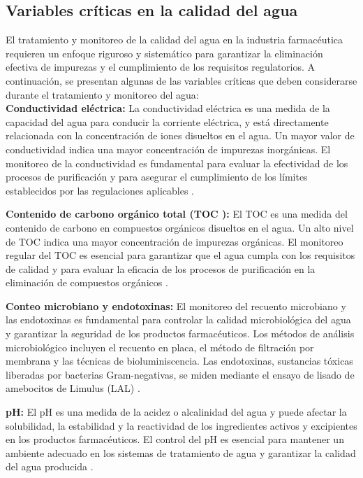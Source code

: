\subsection{Variables críticas en la calidad del agua}

El tratamiento y monitoreo de la calidad del agua en la industria farmacéutica requieren un enfoque riguroso y sistemático para garantizar la eliminación efectiva de impurezas y el cumplimiento de los requisitos regulatorios. A continuación, se presentan algunas de las variables críticas que deben considerarse durante el tratamiento y monitoreo del agua:\\

\textbf{Conductividad eléctrica:} La conductividad eléctrica es una medida de la capacidad del agua para conducir la corriente eléctrica, y 
está directamente relacionada con la concentración de iones disueltos en el agua. Un mayor valor de conductividad indica una mayor 
concentración de impurezas inorgánicas. El monitoreo de la conductividad es fundamental para evaluar la efectividad de los procesos 
de purificación y para asegurar el cumplimiento de los límites establecidos por las regulaciones aplicables \cite{oceanebidaultQueFactoresDeterminan}.

\textbf{Contenido de carbono orgánico total (TOC ):} El TOC es una medida del contenido de carbono en compuestos
orgánicos disueltos en el agua. Un alto nivel de TOC indica una mayor concentración de impurezas orgánicas.
El monitoreo regular del TOC es esencial para garantizar que el agua cumpla con los requisitos de calidad y para evaluar la eficacia 
de los procesos de purificación en la eliminación de compuestos orgánicos \cite{oceanebidaultQueFactoresDeterminan}.

\textbf{Conteo microbiano y endotoxinas:} El monitoreo del recuento microbiano y las endotoxinas es fundamental
para controlar la calidad microbiológica del agua y garantizar la seguridad de los productos farmacéuticos.
Los métodos de análisis microbiológico incluyen el recuento en placa, el método de filtración por membrana
y las técnicas de bioluminiscencia. Las endotoxinas, sustancias tóxicas liberadas por bacterias Gram-negativas,
se miden mediante el ensayo de lisado de amebocitos de Limulus (LAL) \cite{oceanebidaultQueFactoresDeterminan}.

\textbf{pH:} El pH es una medida de la acidez o alcalinidad del agua y puede afectar la solubilidad,
la estabilidad y la reactividad de los ingredientes activos y excipientes en los productos farmacéuticos.
El control del pH es esencial para mantener un ambiente adecuado en los sistemas de tratamiento de agua y
garantizar la calidad del agua producida \cite{oceanebidaultQueFactoresDeterminan}.

